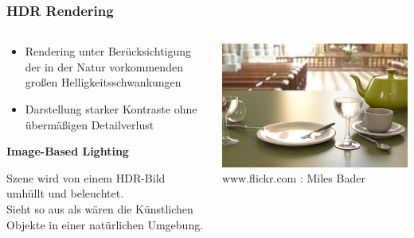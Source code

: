 \documentclass{beamer}
\begin{document}
	\begin{frame}
	\frametitle{HDR Rendering}
	\begin{columns}
		\begin{column}{0.55\textwidth}
			\begin{itemize}[label=\textcolor{red!65!black}{\textbullet}]
				\item Rendering unter Berücksichtigung der in der Natur vorkommenden großen Helligkeitsschwankungen	
				\item Darstellung starker Kontraste ohne übermäßigen Detailverlust	
			\end{itemize}
			\vspace{5mm}
			\hspace{7mm} \textbf{Image-Based Lighting} \\
			\vspace{3mm}
			\hspace*{9mm}
			\begin{minipage}{0.8\textwidth}
				\small  Szene wird von einem HDR-Bild umhüllt und beleuchtet. \\
				\small  Sieht so aus als wären die Künstlichen Objekte in einer natürlichen Umgebung. \\
			\end{minipage}

		\end{column}
		\begin{column}{0.45\textwidth}
				\includegraphics[scale=0.37]{img/bild15.jpg}
				\tiny www.flickr.com : Miles Bader
		\end{column}
	\end{columns}
	\end{frame}
\end{document}

